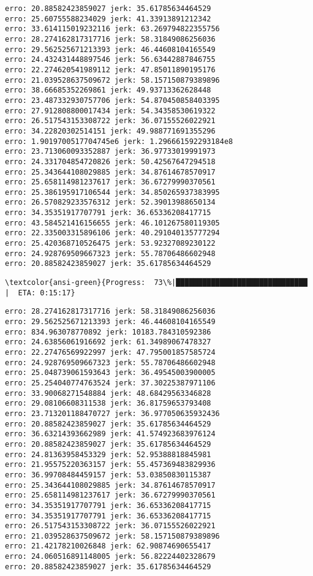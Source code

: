 \documentclass[11pt]{article}
\begin{document}
    \begin{Verbatim}[commandchars=\\\{\}]
erro: 20.88582423859027 jerk: 35.61785634464529
erro: 25.60755588234029 jerk: 41.33913891212342
erro: 33.614115019232116 jerk: 63.269794822355756
erro: 28.274162817317716 jerk: 58.31849086256036
erro: 29.562525671213393 jerk: 46.44608104165549
erro: 24.432431448897546 jerk: 56.63442887846755
erro: 22.274620541989112 jerk: 47.85011890195176
erro: 21.039528637509672 jerk: 58.157150879389896
erro: 38.66685352269861 jerk: 49.93713362628448
erro: 23.487332930757706 jerk: 54.870450858403395
erro: 27.912808800017434 jerk: 54.34358530619322
erro: 26.517543153308722 jerk: 36.07155526022921
erro: 34.22820302514151 jerk: 49.988771691355296
erro: 1.9019700517704745e6 jerk: 1.296661592293184e8
erro: 23.713060093352887 jerk: 36.97733019991973
erro: 24.331704854720826 jerk: 50.42567647294518
erro: 25.343644108029885 jerk: 34.87614678570917
erro: 25.658114981237617 jerk: 36.67279990370561
erro: 25.386195917106544 jerk: 34.850265937383995
erro: 26.570829233576312 jerk: 52.39013988650134
erro: 34.35351917707791 jerk: 36.65336208417715
erro: 43.584521416156655 jerk: 46.101267580119305
erro: 22.335003315896106 jerk: 40.291040135777294
erro: 25.420368710526475 jerk: 53.92327089230122
erro: 24.928769509667323 jerk: 55.78706486602948
erro: 20.88582423859027 jerk: 35.61785634464529

    \end{Verbatim}

    \begin{Verbatim}[commandchars=\\\{\}]
\textcolor{ansi-green}{Progress:  73\%|██████████████████████████████           |  ETA: 0:15:17}
    \end{Verbatim}

    \begin{Verbatim}[commandchars=\\\{\}]
erro: 28.274162817317716 jerk: 58.31849086256036
erro: 29.562525671213393 jerk: 46.44608104165549
erro: 834.963078770892 jerk: 10183.784310592386
erro: 24.63856061916692 jerk: 61.34989067478327
erro: 22.27476569922997 jerk: 47.795001857585724
erro: 24.928769509667323 jerk: 55.78706486602948
erro: 25.048739061593643 jerk: 36.49545003900005
erro: 25.254040774763524 jerk: 37.30225387971106
erro: 33.90068271548884 jerk: 48.68429563346828
erro: 29.08106608311538 jerk: 36.81759653793408
erro: 23.713201188470727 jerk: 36.977050635932436
erro: 20.88582423859027 jerk: 35.61785634464529
erro: 36.63214393662989 jerk: 41.574923683976124
erro: 20.88582423859027 jerk: 35.61785634464529
erro: 24.81363958453329 jerk: 52.95388818845981
erro: 21.95575220363157 jerk: 55.457369483829936
erro: 36.99708484459157 jerk: 53.03850830115387
erro: 25.343644108029885 jerk: 34.87614678570917
erro: 25.658114981237617 jerk: 36.67279990370561
erro: 34.35351917707791 jerk: 36.65336208417715
erro: 34.35351917707791 jerk: 36.65336208417715
erro: 26.517543153308722 jerk: 36.07155526022921
erro: 21.039528637509672 jerk: 58.157150879389896
erro: 21.42178210026848 jerk: 62.90874690655417
erro: 24.060516891148005 jerk: 56.82224402328679
erro: 20.88582423859027 jerk: 35.61785634464529

    \end{Verbatim}
\end{document}
